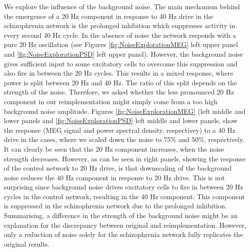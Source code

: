 \documentclass[10pt,a4paper,onecolumn]{article}
\begin{document}
We explore the influence of the background noise. The main mechanism behind the emergence of a 20 Hz component in response
to 40 Hz drive in the schizophrenia network is the prolonged inhibition which suppresses activity in every second 40 Hz cycle. In the absence
of noise the network responds with a pure 20 Hz oscillation (see Figures \ref{fig:NoiseExplorationMEG} left upper panel and \ref{fig:NoiseExplorationPSD} left upper panel). However, the background noise
gives sufficient input to some excitatory cells to overcome this suppression and also fire in between the 20 Hz cycles. This results in a mixed response, 
where power is split between 20 Hz and 40 Hz. The ratio of this split depends on the strength of the noise. Therefore, we asked whether the less pronounced
20 Hz component in our reimplementation might simply come from a too high background noise amplitude. Figures \ref{fig:NoiseExplorationMEG} (left middle and lower panels  and \ref{fig:NoiseExplorationPSD} left middle and lower panels, show the 
response (MEG signal and power spectral density, respectivey) to a 40 Hz drive in the cases, where we scaled down the noise to 75\% and 50\%, respectively. It can clearly be seen that the 20 Hz component increases, when
the noise strength decreases. However, as can be seen in right panels, showing the response of the control network to 20 Hz drive,
is that downscaling of the background noise reduces the 40 Hz component in response to 20 Hz drive. This is not surprising since background noise drives excitatory cells to fire in between 20 Hz cycles in the control network, resulting
in the 40 Hz component. This component is suppressed in the schizophrenia network due to the prolonged inhibition.
Summarising, a difference in the strength of the background noise might be an explanation for the discrepancy between original and reimplementation. However, only a reduction of noise solely for the schizophrenia network 
fully replicates the original results. 
\end{document}
